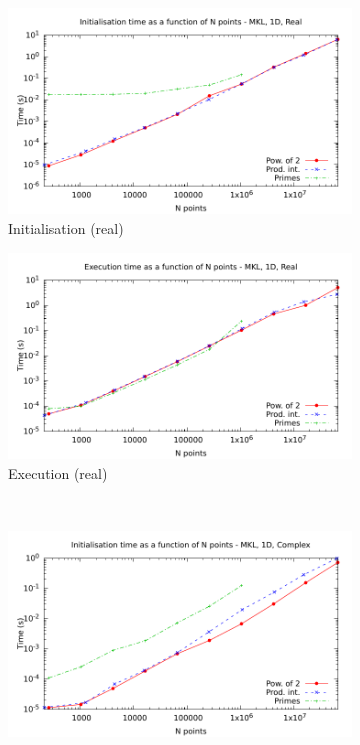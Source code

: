 \documentclass[12pt, a4paper]{article} \setlength{\textheight}{24cm}
\begin{document}
\begin{figure}[htb]
  \centering
  \begin{subfigure}{.5\textwidth}
    \centering
    \includegraphics[width=.9\linewidth]{graphs/1d-mkl-init-r.pdf}
    \caption{Initialisation (real)}
    \label{1DMKLRI}
  \end{subfigure}%
  \begin{subfigure}{.5\textwidth}
    \centering
    \includegraphics[width=.9\linewidth]{graphs/1d-mkl-exec-r.pdf}
    \caption{Execution (real)}
    \label{1DMKLR}
  \end{subfigure}\\
  \begin{subfigure}{.5\textwidth}
    \centering
    \includegraphics[width=.9\linewidth]{graphs/1d-mkl-init-c.pdf}

\end{subfigure}
\end{figure}
\end{document}
